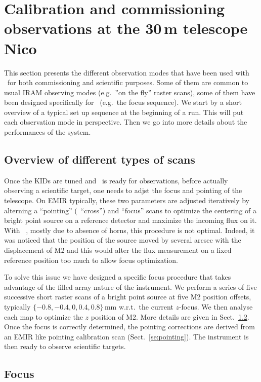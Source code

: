 
\section{Calibration and commissioning observations at the 30\,m telescope {\color{blue} Nico}}

This section presents the different observation modes that have been used with
\nika\ for both commissioning and scientific purposes. Some of them are common
to usual IRAM observing modes (e.g.~''on the fly'' raster scans), some of them
have been designed specifically for \nika\ (e.g.~the focus sequence). We start
by a short overview of a typical set up sequence at the beginning of a run. This
will put each observation mode in perspective. Then we go into more details
about the performances of the system.

\subsection{Overview of different types of scans}

Once the KIDs are tuned and \nika\ is ready for observations, before actually
observing a scientific target, one needs to adjst the focus and pointing of the
telescope. On EMIR typically, these two parameters are adjusted iteratively by
alterning a ``pointing'' (\aka\ ``cross'') and ``focus'' scans to optimize the
centering of a bright point source on a reference detector and maximize the
incoming flux on it. With \nika\ , mostly due to absence of horns, this
procedure is not optimal. Indeed, it was noticed that the position of the source
moved by several arcsec with the displacement of M2 and this would alter the flux
measurement on a fixed reference position too much to allow focus
optimization.

To solve this issue we have designed a specific focus procedure that takes
advantage of the filled array nature of the instrument. We perform a series of
five successive short raster scans of a bright point source at five M2 position
offsets, typically $\{-0.8, -0.4, 0, 0.4, 0.8\}$\,mm w.r.t.~the current
$z$-focus. We then analyse each map to optimize the $z$ position of M2. More
details are given in Sect.~\ref{se:focus}. Once the focus is correctly
determined, the pointing corrections are derived from an EMIR like pointing
calibration scan (Sect.~\ref{se:pointing}). The instrument is then ready to
observe scientific targets.

\subsection{Focus}
\label{se:focus}

